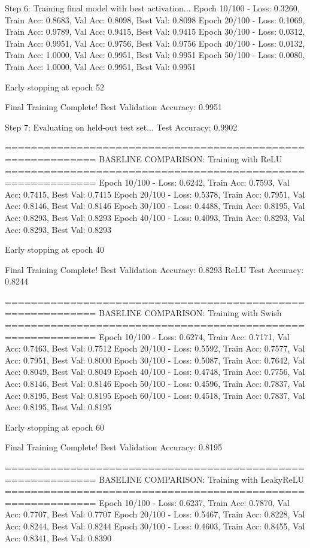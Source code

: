 Step 6: Training final model with best activation...
Epoch  10/100 - Loss: 0.3260, Train Acc: 0.8683, Val Acc: 0.8098, Best Val: 0.8098
Epoch  20/100 - Loss: 0.1069, Train Acc: 0.9789, Val Acc: 0.9415, Best Val: 0.9415
Epoch  30/100 - Loss: 0.0312, Train Acc: 0.9951, Val Acc: 0.9756, Best Val: 0.9756
Epoch  40/100 - Loss: 0.0132, Train Acc: 1.0000, Val Acc: 0.9951, Best Val: 0.9951
Epoch  50/100 - Loss: 0.0080, Train Acc: 1.0000, Val Acc: 0.9951, Best Val: 0.9951

Early stopping at epoch 52

Final Training Complete!
Best Validation Accuracy: 0.9951

Step 7: Evaluating on held-out test set...
Test Accuracy: 0.9902

============================================================
BASELINE COMPARISON: Training with ReLU
============================================================
Epoch  10/100 - Loss: 0.6242, Train Acc: 0.7593, Val Acc: 0.7415, Best Val: 0.7415
Epoch  20/100 - Loss: 0.5378, Train Acc: 0.7951, Val Acc: 0.8146, Best Val: 0.8146
Epoch  30/100 - Loss: 0.4488, Train Acc: 0.8195, Val Acc: 0.8293, Best Val: 0.8293
Epoch  40/100 - Loss: 0.4093, Train Acc: 0.8293, Val Acc: 0.8293, Best Val: 0.8293

Early stopping at epoch 40

Final Training Complete!
Best Validation Accuracy: 0.8293
ReLU Test Accuracy: 0.8244

============================================================
BASELINE COMPARISON: Training with Swish
============================================================
Epoch  10/100 - Loss: 0.6274, Train Acc: 0.7171, Val Acc: 0.7463, Best Val: 0.7512
Epoch  20/100 - Loss: 0.5592, Train Acc: 0.7577, Val Acc: 0.7951, Best Val: 0.8000
Epoch  30/100 - Loss: 0.5087, Train Acc: 0.7642, Val Acc: 0.8049, Best Val: 0.8049
Epoch  40/100 - Loss: 0.4748, Train Acc: 0.7756, Val Acc: 0.8146, Best Val: 0.8146
Epoch  50/100 - Loss: 0.4596, Train Acc: 0.7837, Val Acc: 0.8195, Best Val: 0.8195
Epoch  60/100 - Loss: 0.4518, Train Acc: 0.7837, Val Acc: 0.8195, Best Val: 0.8195

Early stopping at epoch 60

Final Training Complete!
Best Validation Accuracy: 0.8195

============================================================
BASELINE COMPARISON: Training with LeakyReLU
============================================================
Epoch  10/100 - Loss: 0.6237, Train Acc: 0.7870, Val Acc: 0.7707, Best Val: 0.7707
Epoch  20/100 - Loss: 0.5467, Train Acc: 0.8228, Val Acc: 0.8244, Best Val: 0.8244
Epoch  30/100 - Loss: 0.4603, Train Acc: 0.8455, Val Acc: 0.8341, Best Val: 0.8390

